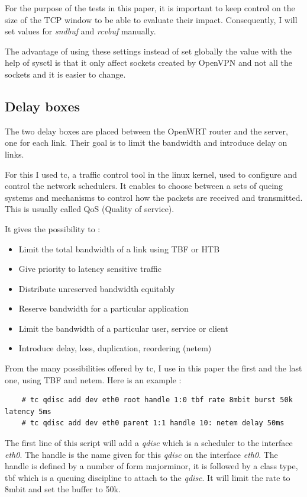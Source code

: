   For the purpose of the tests in this paper, it is important to keep control on the size of the TCP window to be able to evaluate their impact.
  Consequently, I will set values for \textit{sndbuf} and \textit{rcvbuf} manually.

  The advantage of using these settings instead of set globally the value with the help of sysctl is that it only affect sockets created by OpenVPN and not all
  the sockets and it is easier to change.

  \subsection{Delay boxes}

  The two delay boxes are placed between the OpenWRT router and the server, one for each link. Their goal is to limit the bandwidth and introduce delay on links.

  For this I used tc, a traffic control tool in the linux kernel, used to configure and control the network schedulers. It enables to choose between a sets
  of queing systems and mechanisms to control how the packets are received and transmitted. This is usually called QoS (Quality of service).

  It gives the possibility to :
  \begin{itemize}
    \item Limit the total bandwidth of a link using TBF or HTB
    \item Give priority to latency sensitive traffic
    \item Distribute unreserved bandwidth equitably
    \item Reserve bandwidth for a particular application
    \item Limit the bandwidth of a particular user, service or client
    \item Introduce delay, loss, duplication, reordering (netem)
  \end{itemize}

  From the many possibilities offered by tc, I use in this paper the first and the last one, using TBF and netem.
  Here is an example :

  \begin{lstlisting}
    # tc qdisc add dev eth0 root handle 1:0 tbf rate 8mbit burst 50k latency 5ms
    # tc qdisc add dev eth0 parent 1:1 handle 10: netem delay 50ms
  \end{lstlisting}

  The first line of this script will add a \textit{qdisc} which is a scheduler to the interface \textit{eth0}. The handle is the name given for this \textit{qdisc} on the interface \textit{eth0}.
  The handle is defined by a number of form major\:minor, it is followed by a class type, tbf which is a queuing discipline to attach to the \textit{qdisc}.
  It will limit the rate to 8mbit and set the buffer to 50k.

